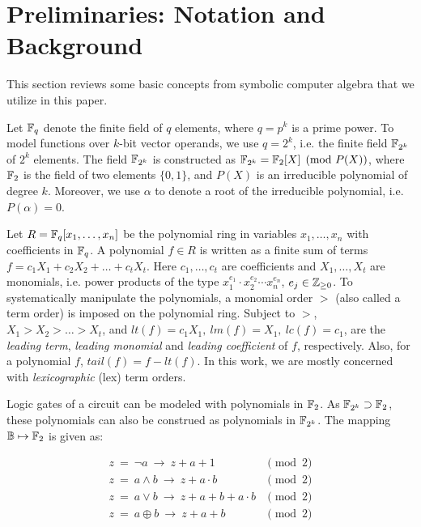 \section{Preliminaries: Notation and Background}
\label{sec:prelim}
This section reviews some basic concepts from symbolic computer
algebra that we utilize in this paper. 



Let ${\mathbb{F}}_q$ denote the finite field of $q$ elements, where $q=p^k$ is
a prime power. To model functions over $k$-bit vector operands, we
use $q = 2^k$, i.e. the finite field ${\mathbb{F}}_{2^k}$ of $2^k$
elements. The field ${\mathbb{F}}_{2^k}$ is constructed as ${\mathbb{F}}_{2^k} = {\mathbb{F}}_{2}[X]\pmod{
  P(X)}$, where ${\mathbb{F}}_{2}$ is the field of two elements $\{0, 1\}$, and
$P(X)$ is an irreducible polynomial of degree $k$. Moreover, we use
$\alpha$ to denote a root of the irreducible polynomial,
i.e. $P(\alpha) =0$.  

Let $R={\mathbb{F}}_q[x_1,\dots,x_n]$ be the  polynomial ring in variables
$x_1,\dots,x_n$ with coefficients in ${\mathbb{F}}_q$. A polynomial $f \in R$ is 
written as a finite sum of terms  $f = c_1 X_1 +  c_2 X_2 + \dots +
c_t X_t$.  Here $c_1, \dots, c_t$ are coefficients and $X_1, \dots,
X_t$ are monomials, i.e. power products of the type $x_1^{e_{1}}\cdot
x_2^{e_{2}}\cdots x_n^{e_{n}}$,  $e_j \in {\mathbb{Z}}_{\geq  0}$. To
systematically manipulate the polynomials, a monomial order $>$ (also
called a term order) is imposed on the polynomial ring.
Subject to $>$, $X_1 >X_2 > \dots >  X_t$, and 
$lt(f) = c_1 X_1, ~lm(f) = X_1, ~lc(f) = c_1$, are the {\it
leading   term}, {\it   leading monomial} and {\it   leading
coefficient} of $f$, respectively. Also, for a polynomial $f$,
$tail(f) = f - lt(f)$. In this work, we are mostly concerned with {\it
  lexicographic} (lex) term orders. 

\par Logic gates of a circuit can be modeled with polynomials in
${\mathbb{F}}_2$. As ${\mathbb{F}}_{2^k} \supset {\mathbb{F}}_2$, these polynomials can also be
construed as polynomials in ${\mathbb{F}}_{2^k}$.  The mapping ${\mathbb{B}} \mapsto {\mathbb{F}}_2$ is
given as: 


\begin{equation}
\label{bool2poly}
\begin{split}
z ~ =  ~ \neg a ~ \rightarrow ~ z+a+1 & \pmod 2  \\
z ~ =  ~ a \wedge b ~ \rightarrow ~ z+a \cdot b & \pmod 2\\
z ~ =  ~ a \vee b ~ \rightarrow ~ z+a+b+a \cdot b & \pmod 2 \\
z ~ =  ~ a \oplus b ~ \rightarrow ~ z+a+b & \pmod 2 
\end{split}
\end{equation}



